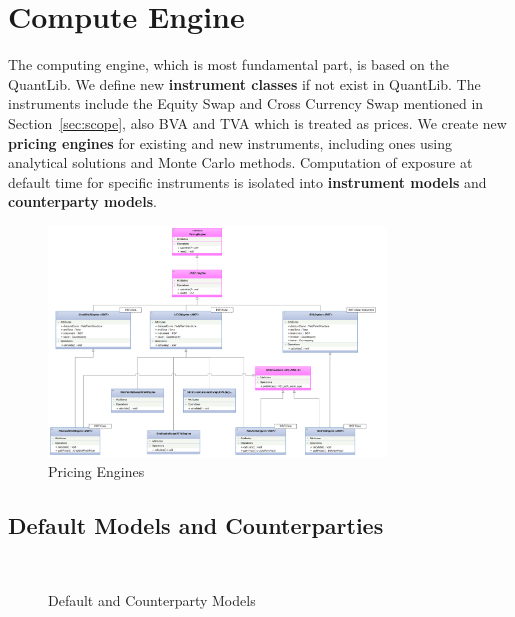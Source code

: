 \section{Compute Engine}\label{sec:design}

The computing engine, which is most fundamental part, is based on the QuantLib\cite{quantlib}. We define new \textbf{instrument classes} if not exist in QuantLib. The instruments include the Equity Swap and Cross Currency Swap mentioned in Section~\ref{sec:scope}, also BVA and TVA which is treated as prices. We create new \textbf{pricing engines} for existing and new instruments, including ones using analytical solutions and Monte Carlo methods. Computation of exposure at default time for specific instruments is isolated into \textbf{instrument models} and \textbf{counterparty models}.

\begin{figure}[h]
  \centering
  \includegraphics[width=0.8\textwidth]{pricingengine.png}
  \caption{Pricing Engines}\label{fig:pricingengines}
\end{figure}

\subsection{Default Models and Counterparties}

\begin{figure}
  \centering
  ~~~~
  \caption{Default and Counterparty Models}\label{fig:defaultandcouterparties}
\end{figure}

